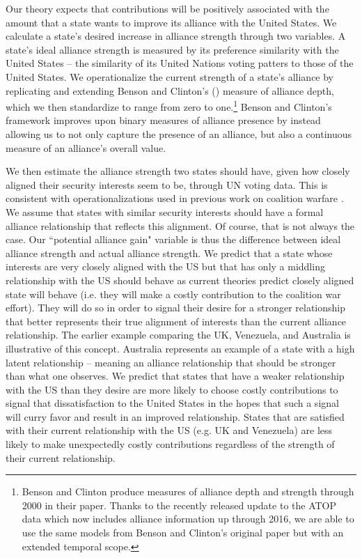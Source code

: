 \documentclass[12pt,letterpaper]{article}
\begin{document}
		Our theory expects that contributions will be positively associated with the amount that a state wants to improve its alliance with the United States. We calculate a state's desired increase in alliance strength through two variables. A state's ideal alliance strength is measured by its preference similarity with the United States -- the similarity of its United Nations voting patters to those of the United States. We operationalize the current strength of a state's alliance by replicating and extending Benson and Clinton's (\citeyear{benson_assessingvariationformal_2016}) measure of alliance depth, which we then standardize to range from zero to one.\footnote{Benson and Clinton produce measures of alliance depth and strength through 2000 in their paper. Thanks to the recently released update to the ATOP data \citep{leeds_alliancetreatyobligations_2002} which now includes alliance information up through 2016, we are able to use the same models from Benson and Clinton's original paper  but with an extended temporal scope.} Benson and Clinton's framework improves upon binary measures of alliance presence by instead allowing us to not only capture the presence of an alliance, but also a continuous measure of an alliance's overall value.

		We then estimate the alliance strength two states should have, given how closely aligned their security interests seem to be, through UN voting data. This is consistent with operationalizations used in previous work on coalition warfare \citep{wolford_politicsmilitarycoalitions_2015}. We assume that states with similar security interests should have a formal alliance relationship that reflects this alignment. Of course, that is not always the case. Our ``potential alliance gain" variable is thus the difference between ideal alliance strength and actual alliance strength. We predict that a state whose interests are very closely aligned with the US but that has only a middling relationship with the US should behave as current theories predict closely aligned state will behave (i.e. they will make a costly contribution to the coalition war effort). They will do so in order to signal their desire for a stronger relationship that better represents their true alignment of interests than the current alliance relationship. The earlier example comparing the UK, Venezuela, and Australia is illustrative of this concept. Australia represents an example of a state with a high latent relationship -- meaning an alliance relationship that should be stronger than what one observes. We predict that states that have a weaker relationship with the US than they desire are more likely to choose costly contributions to signal that dissatisfaction to the United States in the hopes that such a signal will curry favor and result in an improved relationship. States that are satisfied with their current relationship with the US (e.g. UK and Venezuela) are less likely to make unexpectedly costly contributions regardless of the strength of their current relationship.
\end{document}
